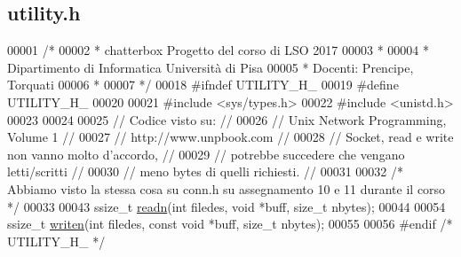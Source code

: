 \hypertarget{utility_8h_source}{}\subsection{utility.\+h}

\begin{DoxyCode}
00001 \textcolor{comment}{/*}
00002 \textcolor{comment}{ * chatterbox Progetto del corso di LSO 2017}
00003 \textcolor{comment}{ *}
00004 \textcolor{comment}{ * Dipartimento di Informatica Università di Pisa}
00005 \textcolor{comment}{ * Docenti: Prencipe, Torquati}
00006 \textcolor{comment}{ *}
00007 \textcolor{comment}{ */}
00018 \textcolor{preprocessor}{#ifndef UTILITY\_H\_}
00019 \textcolor{preprocessor}{#define UTILITY\_H\_}
00020 
00021 \textcolor{preprocessor}{#include <sys/types.h>}
00022 \textcolor{preprocessor}{#include <unistd.h>}
00023 
00024 
00025 \textcolor{comment}{//    Codice visto su:                             //}
00026 \textcolor{comment}{//    Unix Network Programming, Volume 1           //}
00027 \textcolor{comment}{//    http://www.unpbook.com                       //}
00028 \textcolor{comment}{// Socket, read e write non vanno molto d'accordo, //}
00029 \textcolor{comment}{// potrebbe succedere che vengano letti/scritti    //}
00030 \textcolor{comment}{// meno bytes di quelli richiesti.                 //}
00031 
00032 \textcolor{comment}{/* Abbiamo visto la stessa cosa su conn.h su assegnamento 10 e 11 durante il corso */}
00033 
00043 ssize\_t \mbox{\hyperlink{utility_8h_ac9259628f4bca1f9d37d9d1f87a73b1b}{readn}}(\textcolor{keywordtype}{int} filedes, \textcolor{keywordtype}{void} *buff, \textcolor{keywordtype}{size\_t} nbytes);
00044 
00054 ssize\_t \mbox{\hyperlink{utility_8h_ac6671001233740b43906caff6bf25339}{writen}}(\textcolor{keywordtype}{int} filedes, \textcolor{keyword}{const} \textcolor{keywordtype}{void} *buff, \textcolor{keywordtype}{size\_t} nbytes);
00055 
00056 \textcolor{preprocessor}{#endif }\textcolor{comment}{/* UTILITY\_H\_ */}\textcolor{preprocessor}{}
\end{DoxyCode}
